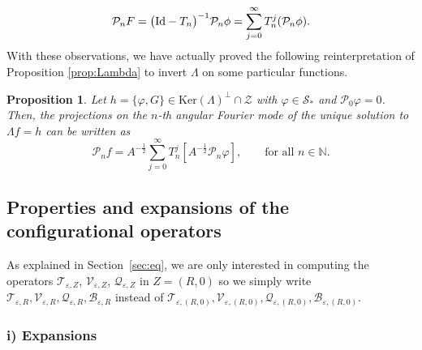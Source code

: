 \documentclass[11pt,reqno,a4paper]{amsart}
\def\eps{\varepsilon}
\def\NN {\mathbb{N}}
\newcommand{\cB}{\mathcal{B}}
\newcommand{\cP}{\mathcal{P}}
\newcommand{\cQ}{\mathcal{Q}}
\newcommand{\cS}{\mathcal{S}}
\newcommand{\cT}{\mathcal{T}}
\newcommand{\cV}{\mathcal{V}}
\newcommand{\cZ}{\mathcal{Z}}
\newcommand{\1}{\mathbbm{1}}
\newtheorem{proposition}{Proposition}[section]
\theoremstyle{definition}
\theoremstyle{definition}
\numberwithin{equation}{section}
\begin{document}
\begin{align}
    \cP_n F=\big({\rm Id}-T_n\big)^{-1}\cP_n\phi=\sum_{j=0}^\infty T_{n}^j(\cP_n\phi).
\end{align}
With these observations, we have actually proved the following reinterpretation of Proposition \ref{prop:Lambda} to invert $\Lambda$ on some particular functions.
\begin{proposition}
\label{prop:explicitsol}
    Let $h=\{\varphi,G\}\in \mathrm{Ker}(\Lambda)^\perp\cap \cZ$ with $\varphi\in \cS_*$ and $\cP_0\varphi=0$. Then, the projections on the $n$-th angular Fourier mode of the unique solution to $\Lambda f=h$ can be written as
    \begin{equation}
        \cP_nf=A^{-\frac12}\sum_{j=0}^\infty T_n^j[A^{-\frac12}\cP_n\varphi], \qquad \text{for all } n\in \NN.
    \end{equation}
\end{proposition}

\subsection{Properties and expansions of the configurational operators} \label{sec:propExpAdj}

As explained in Section~\ref{sec:eq}, we are only interested in computing the operators $\cT_{\eps,Z}$, $\cV_{\eps,Z}$, $\cQ_{\eps,Z}$ in $Z = (R,0)$ so we simply write $\cT_{\eps,R},\cV_{\eps,R},\cQ_{\eps,R},\cB_{\eps,R}$ instead of $\cT_{\eps,(R,0)},\cV_{\eps,(R,0)},\cQ_{\eps,(R,0)},\cB_{\eps,(R,0)}$.



\subsubsection*{{\rm i)} \textbf{Expansions}}
\end{document}
